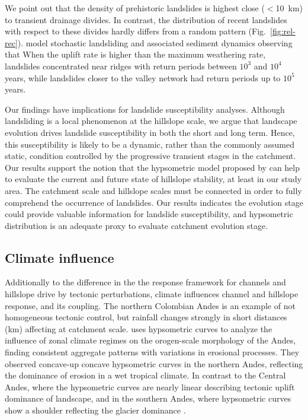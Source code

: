 \documentclass[draft]{agujournal2019}
\begin{document}
\par We point out that the density of prehistoric landslides is highest close ($<$10~km) to transient drainage divides. In contrast, the distribution of recent landslides with respect to these divides hardly differs from a random pattern (Fig.~\ref{fig:rel-rec}).  model stochastic landsliding and associated sediment dynamics observing that When the uplift rate is higher than the maximum weathering rate, landslides concentrated near ridges with return periods between $10^3$ and $10^4$ years, while landslides closer to the valley network had return periods up to $10^5$ years.

\par Our findings have implications for landslide susceptibility analyses. Although landsliding is a local phenomenon at the hillslope scale, we argue that landscape evolution drives landslide susceptibility in both the short and long term. Hence, this susceptibility is likely to be a dynamic, rather than the commonly assumed static, condition controlled by the progressive transient stages in the catchment. Our results support the notion that the hypsometric model proposed by  can help to evaluate the current and future state of hillslope stability, at least in our study area.  The catchment scale and hillslope scales must be connected in order to fully comprehend the occurrence of landslides. Our results indicates the evolution stage could provide valuable information for landslide susceptibility, and hypsometric distribution is an adequate proxy to evaluate catchment evolution stage. 

\subsection{Climate influence}
\par Additionally to the difference in the the response framework for channels and hillslope drive by tectonic perturbations, climate influences channel and hillslope response, and its coupling. The northern Colombian Andes is an example of not homogeneous tectonic control, but rainfall changes strongly in short distances (km) affecting at catchment scale. \cite{montgomery2001climate} uses hypsometric curves to analyze the influence of zonal climate regimes on the orogen-scale morphology of the Andes, finding consistent aggregate patterns with variations in erosional processes. They observed concave-up concave hypsometric curves in the northern Andes, reﬂecting the dominance of erosion in a wet tropical climate. In contrast to the Central Andes, where the hypsometric curves are nearly linear describing tectonic uplift dominance of landscape, and in the southern Andes, where hypsometric curves show a shoulder reflecting the glacier dominance .
\end{document}
